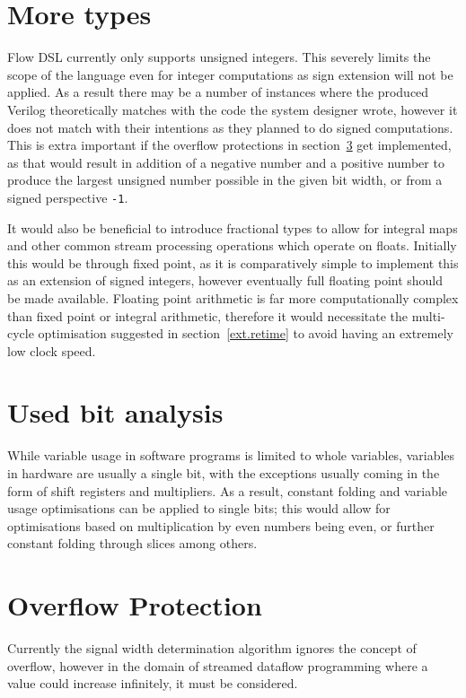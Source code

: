 \section{More types}
Flow DSL currently only supports unsigned integers. This severely limits the scope of the language even for integer computations as sign extension will not be applied. As a result there may be a number of instances where the produced Verilog theoretically matches with the code the system designer wrote, however it does not match with their intentions as they planned to do signed computations. This is extra important if the overflow protections in section \ref{overflow.prot} get implemented, as that would result in addition of a negative number and a positive number to produce the largest unsigned number possible in the given bit width, or from a signed perspective \lstinline|-1|.

It would also be beneficial to introduce fractional types to allow for integral maps and other common stream processing operations which operate on floats. Initially this would be through fixed point, as it is comparatively simple to implement this as an extension of signed integers, however eventually full floating point should be made available. Floating point arithmetic is far more computationally complex than fixed point or integral arithmetic, therefore it would necessitate the multi-cycle optimisation suggested in section \ref{ext.retime} to avoid having an extremely low clock speed.

\section{Used bit analysis}
While variable usage in software programs is limited to whole variables, variables in hardware are usually a single bit, with the exceptions usually coming in the form of shift registers and multipliers. As a result, constant folding and variable usage optimisations can be applied to single bits; this would allow for optimisations based on multiplication by even numbers being even, or further constant folding through slices among others.

\section{Overflow Protection}\label{overflow.prot}
Currently the signal width determination algorithm ignores the concept of overflow, however in the domain of streamed dataflow programming where a value could increase infinitely, it must be considered.


